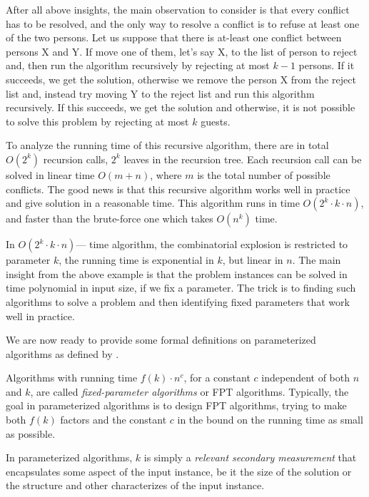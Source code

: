 After all above insights, the main observation to consider is that every conflict has to be resolved, and the only way to resolve a conflict is to refuse at least one of the two persons.
Let us suppose that there is at-least one conflict between persons X and Y. 
If move one of them, let's say X, to the list of person to reject and, then run the algorithm recursively by rejecting at most $k-1$ persons.
If it succeeds, we get the solution, otherwise we remove the person X from the reject list and, instead try moving Y to the reject list and run this algorithm recursively.
If this succeeds, we get the solution and otherwise, it is not possible to solve this problem by rejecting at most $k$ guests.

To analyze the running time of this recursive algorithm, there are in total $O(2^k)$ recursion calls, $2^k$ leaves in the recursion tree.
Each recursion call can be solved in linear time $O(m+n)$, where $m$ is the total number of possible conflicts.
The good news is that this recursive algorithm works well in practice and give solution in a reasonable time.
This algorithm runs in time $O(2^k \cdot k \cdot n)$, 
and faster than the brute-force one which takes $O(n^k)$ time.


In $O(2^k \cdot k \cdot n)$--- time algorithm, the combinatorial explosion is restricted to parameter $k$,
the running time is exponential in $k$, but linear in $n$.
The main insight from the above example is that the problem instances can be solved in time polynomial in input size, if we fix a parameter. 
The trick is to finding such algorithms to solve a problem and then identifying fixed parameters that work well in practice. 

We are now ready to provide some formal definitions on parameterized algorithms as defined by \cite{cygan2015parameterized}.

\begin{definition}
 Algorithms with running time $f(k)\cdot n^c$, for a constant $c$ independent of both $n$ and $k$, are called \textit{fixed-parameter algorithms} or FPT algorithms.
 Typically, the goal in parameterized algorithms is to design FPT algorithms, trying to make both $f(k)$ factors 
 and the constant $c$ in the bound on the running time as small as possible. 
 \end{definition}
 
 In parameterized algorithms, $k$ is simply a \textit{relevant secondary measurement} 
 that encapsulates some aspect of the input instance, be it the size of the solution or the structure and other characterizes of the input instance.


